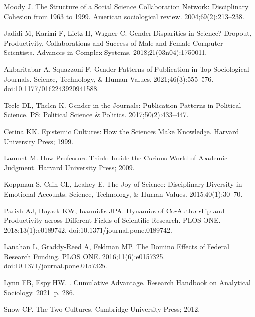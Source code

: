 \documentclass[
  10pt,
  letterpaper,
]{article}
\begin{document}
\begin{thebibliography}{10}
Moody J.
\newblock The Structure of a Social Science Collaboration Network: {{Disciplinary}} Cohesion from 1963 to 1999.
\newblock American sociological review. 2004;69(2):213--238.

Jadidi M, Karimi F, Lietz H, Wagner C.
\newblock Gender Disparities in Science? {{Dropout}}, Productivity, Collaborations and Success of Male and Female Computer Scientists.
\newblock Advances in Complex Systems. 2018;21(03n04):1750011.

Akbaritabar A, Squazzoni F.
\newblock Gender {{Patterns}} of {{Publication}} in {{Top Sociological Journals}}.
\newblock Science, Technology, \& Human Values. 2021;46(3):555--576.
\newblock doi:{10.1177/0162243920941588}.

Teele DL, Thelen K.
\newblock Gender in the Journals: {{Publication}} Patterns in Political Science.
\newblock PS: Political Science \& Politics. 2017;50(2):433--447.

Cetina KK.
\newblock Epistemic {{Cultures}}: {{How}} the {{Sciences Make Knowledge}}.
\newblock Harvard University Press; 1999.

Lamont M.
\newblock How {{Professors Think}}: {{Inside}} the {{Curious World}} of {{Academic Judgment}}.
\newblock Harvard University Press; 2009.

Koppman S, Cain CL, Leahey E.
\newblock The Joy of Science: {{Disciplinary}} Diversity in Emotional Accounts.
\newblock Science, Technology, \& Human Values. 2015;40(1):30--70.

Parish AJ, Boyack KW, Ioannidis JPA.
\newblock Dynamics of Co-Authorship and Productivity across Different Fields of Scientific Research.
\newblock PLOS ONE. 2018;13(1):e0189742.
\newblock doi:{10.1371/journal.pone.0189742}.

Lanahan L, {Graddy-Reed} A, Feldman MP.
\newblock The {{Domino Effects}} of {{Federal Research Funding}}.
\newblock PLOS ONE. 2016;11(6):e0157325.
\newblock doi:{10.1371/journal.pone.0157325}.

Lynn FB, Espy HW.
. {{Cumulative}} Advantage.
\newblock Research Handbook on Analytical Sociology. 2021; p. 286.

Snow CP.
\newblock The Two Cultures.
\newblock Cambridge University Press; 2012.


\end{thebibliography}
\end{document}
